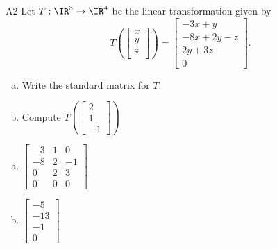 \begin{problem}{A2}
Let $T: \IR^3\rightarrow \IR^4$ be the linear transformation given by $$T\left(\begin{bmatrix} x \\ y \\ z \\  \end{bmatrix} \right) = \begin{bmatrix} -3x+y \\ -8x+2y-z \\ 2y+3z \\ 0 \end{bmatrix}.$$
\begin{enumerate}[(a)]
\item Write the standard matrix for $T$.
\item Compute \(T\left( \begin{bmatrix} 2 \\ 1 \\ -1 \end{bmatrix}\right)\)
\end{enumerate}
\end{problem}
\begin{solution}
\begin{enumerate}[(a)]
\item \(\begin{bmatrix} -3 & 1 & 0 \\ -8 & 2 & -1 \\ 0 & 2 & 3 \\ 0 & 0 & 0 \end{bmatrix}\)
\item \(\begin{bmatrix} -5 \\ -13 \\ -1 \\ 0 \end{bmatrix}\)
\end{enumerate}
\end{solution}

